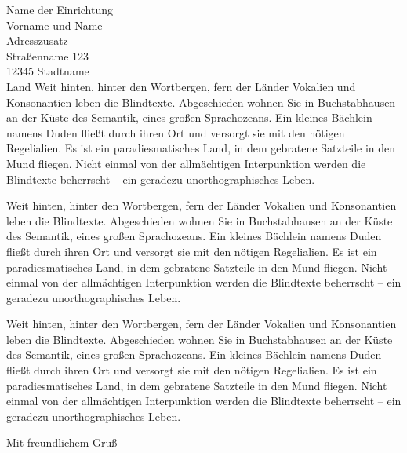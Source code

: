 \documentclass[unijena]{scrlttr2}
\begin{document}
\begin{letter}{%
Name der Einrichtung\\
Vorname und Name\\
Adresszusatz\\
Straßenname 123\\
12345 Stadtname\\
Land
}
Weit hinten, hinter den Wortbergen, fern der Länder Vokalien und Konsonantien
leben die Blindtexte. Abgeschieden wohnen Sie in Buchstabhausen an der Küste
des Semantik, eines großen Sprachozeans. Ein kleines Bächlein namens Duden
fließt durch ihren Ort und versorgt sie mit den nötigen Regelialien. Es ist
ein paradiesmatisches Land, in dem gebratene Satzteile in den Mund
fliegen. Nicht einmal von der allmächtigen Interpunktion werden die Blindtexte
beherrscht – ein geradezu unorthographisches Leben.

Weit hinten, hinter den Wortbergen, fern der Länder Vokalien und Konsonantien
leben die Blindtexte. Abgeschieden wohnen Sie in Buchstabhausen an der Küste
des Semantik, eines großen Sprachozeans. Ein kleines Bächlein namens Duden
fließt durch ihren Ort und versorgt sie mit den nötigen Regelialien. Es ist
ein paradiesmatisches Land, in dem gebratene Satzteile in den Mund
fliegen. Nicht einmal von der allmächtigen Interpunktion werden die Blindtexte
beherrscht – ein geradezu unorthographisches Leben.

Weit hinten, hinter den Wortbergen, fern der Länder Vokalien und Konsonantien
leben die Blindtexte. Abgeschieden wohnen Sie in Buchstabhausen an der Küste
des Semantik, eines großen Sprachozeans. Ein kleines Bächlein namens Duden
fließt durch ihren Ort und versorgt sie mit den nötigen Regelialien. Es ist
ein paradiesmatisches Land, in dem gebratene Satzteile in den Mund
fliegen. Nicht einmal von der allmächtigen Interpunktion werden die Blindtexte
beherrscht – ein geradezu unorthographisches Leben.

\closing{Mit freundlichem Gruß}
\end{letter}
\end{document}
